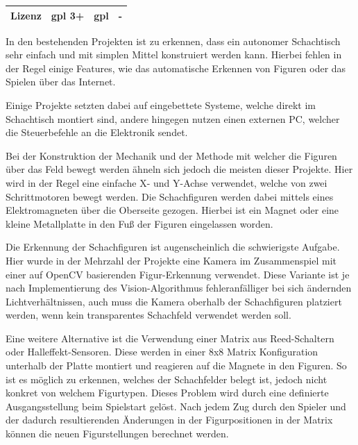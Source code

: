 \begin{longtable}[]{@{}llll@{}}
\begin{minipage}[t]{0.20\columnwidth}\raggedright
Lizenz\strut
\end{minipage} & \begin{minipage}[t]{0.24\columnwidth}\raggedright
\gls{gpl} 3+\strut
\end{minipage} & \begin{minipage}[t]{0.26\columnwidth}\raggedright
\gls{gpl}\strut
\end{minipage} & \begin{minipage}[t]{0.19\columnwidth}\raggedright
-\strut
\end{minipage}\tabularnewline
\bottomrule
\end{longtable}

In den bestehenden Projekten ist zu erkennen, dass ein autonomer
Schachtisch sehr einfach und mit simplen Mittel konstruiert werden kann.
Hierbei fehlen in der Regel einige Features, wie das automatische
Erkennen von Figuren oder das Spielen über das Internet.

Einige Projekte setzten dabei auf eingebettete Systeme, welche direkt im
Schachtisch montiert sind, andere hingegen nutzen einen externen PC,
welcher die Steuerbefehle an die Elektronik sendet.

Bei der Konstruktion der Mechanik und der Methode mit welcher die
Figuren über das Feld bewegt werden ähneln sich jedoch die meisten
dieser Projekte. Hier wird in der Regel eine einfache X- und Y-Achse
verwendet, welche von zwei Schrittmotoren bewegt werden. Die
Schachfiguren werden dabei mittels eines Elektromagneten über die
Oberseite gezogen. Hierbei ist ein Magnet oder eine kleine Metallplatte
in den Fuß der Figuren eingelassen worden.

Die Erkennung der Schachfiguren ist augenscheinlich die schwierigste
Aufgabe. Hier wurde in der Mehrzahl der Projekte eine Kamera im
Zusammenspiel mit einer auf OpenCV basierenden Figur-Erkennung
verwendet. Diese Variante ist je nach Implementierung des
Vision-Algorithmus fehleranfälliger bei sich ändernden
Lichtverhältnissen, auch muss die Kamera oberhalb der Schachfiguren
platziert werden, wenn kein transparentes Schachfeld verwendet werden
soll.

Eine weitere Alternative ist die Verwendung einer Matrix aus
Reed-Schaltern oder Halleffekt-Sensoren. Diese werden in einer 8x8
Matrix Konfiguration unterhalb der Platte montiert und reagieren auf die
Magnete in den Figuren. So ist es möglich zu erkennen, welches der
Schachfelder belegt ist, jedoch nicht konkret von welchem Figurtypen.
Dieses Problem wird durch eine definierte Ausgangsstellung beim
Spielstart gelöst. Nach jedem Zug durch den Spieler und der dadurch
resultierenden Änderungen in der Figurpositionen in der Matrix können
die neuen Figurstellungen berechnet werden.

